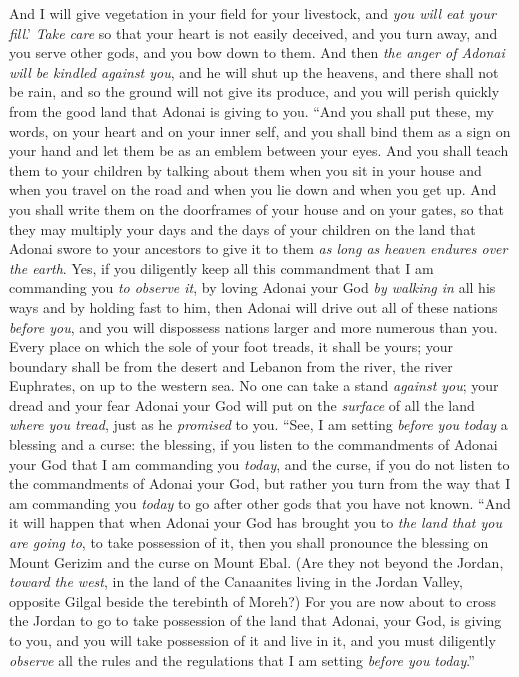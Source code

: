 \begin{biblechapter}
\verse And I will give vegetation in your field for your livestock, and \textit{you will eat your fill}.’
\verse \textit{Take care} so that your heart is not easily deceived, and you turn away, and you serve other gods, and you bow down to them.
\verse And then \textit{the anger of Adonai will be kindled against you}, and he will shut up the heavens, and there shall not be rain, and so the ground will not give its produce, and you will perish quickly from the good land that Adonai is giving to you.
\verse “And you shall put these, my words, on your heart and on your inner self, and you shall bind them as a sign on your hand and let them be as an emblem between your eyes.
\verse And you shall teach them to your children by talking about them when you sit in your house and when you travel on the road and when you lie down and when you get up.
\verse And you shall write them on the doorframes of your house and on your gates,
\verse so that they may multiply your days and the days of your children on the land that Adonai swore to your ancestors to give it to them \textit{as long as heaven endures over the earth}.
\verse Yes, if you diligently keep all this commandment that I am commanding you \textit{to observe it},  by loving Adonai your God \textit{by walking in} all his ways and by holding fast to him,
\verse then Adonai will drive out all of these nations \textit{before you}, and you will dispossess nations larger and more numerous than you.
\verse Every place on which the sole of your foot treads, it shall be yours; your boundary shall be from the desert and Lebanon from the river, the river Euphrates, on up to the western sea.
\verse No one can take a stand \textit{against you}; your dread and your fear Adonai your God will put on the \textit{surface} of all the land \textit{where you tread}, just as he \textit{promised} to you.
\verse “See, I am setting \textit{before you} \textit{today} a blessing and a curse:
\verse the blessing, if you listen to the commandments of Adonai your God that I am commanding you \textit{today},
\verse and the curse, if you do not listen to the commandments of Adonai your God, but rather you turn from the way that I am commanding you \textit{today} to go after other gods that you have not known.
\verse “And it will happen that when Adonai your God has brought you to \textit{the land that you are going to}, to take possession of it, then you shall pronounce the blessing on Mount Gerizim and the curse on Mount Ebal.
\verse (Are they not beyond the Jordan, \textit{toward the west}, in the land of the Canaanites living in the Jordan Valley, opposite Gilgal beside the terebinth of Moreh?)
\verse For you are now about to cross the Jordan to go to take possession of the land that Adonai, your God, is giving to you, and you will take possession of it and live in it,
\verse and you must diligently \textit{observe} all the rules and the regulations that I am setting \textit{before you} \textit{today}.”
\end{biblechapter}

